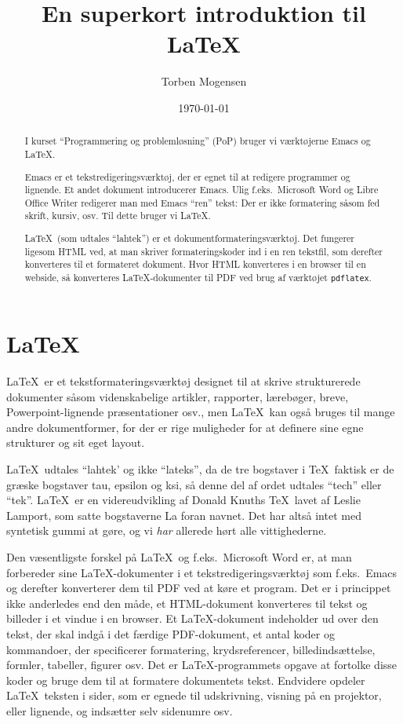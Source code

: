 \documentclass[a4paper]{report}
\begin{document}
\title{En superkort introduktion til \LaTeX}

\author{Torben Mogensen}
\date{\today}

\maketitle

\begin{abstract}
I kurset ``Programmering og problemløsning'' (PoP) bruger vi
værktøjerne Emacs og \LaTeX.

Emacs er et tekstredigeringsværktøj, der er egnet til at redigere
programmer og lignende.  Et andet dokument introducerer Emacs.  Ulig
f.eks.\ Microsoft Word og Libre Office Writer redigerer man med Emacs
``ren'' tekst: Der er ikke formatering såsom fed skrift, kursiv, osv.
Til dette bruger vi \LaTeX.

\LaTeX\ (som udtales ``lahtek'') er et dokumentformateringsværktøj.
Det fungerer ligesom HTML ved, at man skriver formateringskoder ind i
en ren tekstfil, som derefter konverteres til et formateret dokument.
Hvor HTML konverteres i en browser til en webside, så konverteres
\LaTeX-dokumenter til PDF ved brug af værktøjet \texttt{pdflatex}.
\end{abstract}

\tableofcontents


\chapter{\LaTeX}

\LaTeX\ er et tekstformateringsværktøj designet til at skrive
strukturerede dokumenter såsom videnskabelige artikler, rapporter,
lærebøger, breve, Powerpoint-lignende præsentationer osv., men
\LaTeX\ kan også bruges til mange andre dokumentformer, for der er
rige muligheder for at definere sine egne strukturer og sit eget
layout.

\LaTeX\ udtales ``lahtek' og ikke ``lateks'', da de tre bogstaver i
\TeX\ faktisk er de græske bogstaver tau, epsilon og ksi, så denne del
af ordet udtales ``tech'' eller ``tek''. \LaTeX\ er en videreudvikling
af Donald Knuths \TeX\ lavet af Leslie Lamport, som satte bogstaverne
\textsf{La} foran navnet.  Det har altså intet med syntetisk gummi at
gøre, og vi \emph{har} allerede hørt alle vittighederne.

Den væsentligste forskel på \LaTeX\ og f.eks.~Microsoft Word er, at man
forbereder sine \LaTeX-dokumenter i et tekstredigeringsværktøj som
f.eks.~Emacs og derefter konverterer dem til PDF ved at køre et
program.  Det er i princippet ikke anderledes end den måde, et
HTML-dokument konverteres til tekst og billeder i et vindue i en
browser.  Et \LaTeX-dokument indeholder ud over den tekst, der skal
indgå i det færdige PDF-dokument, et antal koder og kommandoer, der
specificerer formatering, krydsreferencer, billedindsættelse,
formler, tabeller, figurer osv.  Det er \LaTeX-programmets opgave at
fortolke disse koder og bruge dem til at formatere dokumentets tekst.
Endvidere opdeler \LaTeX\ teksten i sider, som er egnede til
udskrivning, visning på en projektor, eller lignende, og indsætter
selv sidenumre osv.
\end{document}
